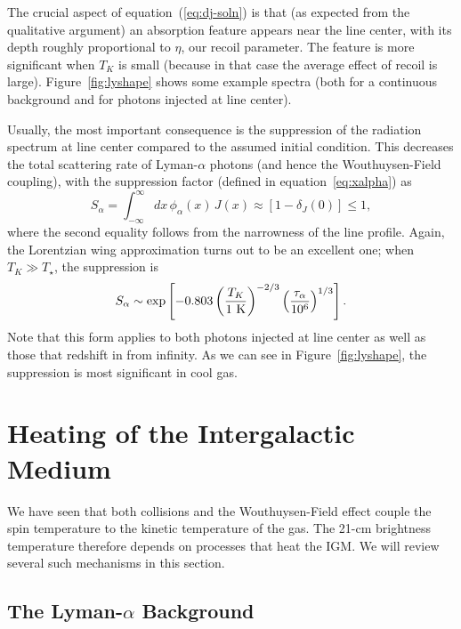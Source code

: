 The crucial aspect of equation~(\ref{eq:dj-soln}) is that (as expected from the qualitative argument) an absorption feature appears near the line center, with its depth roughly proportional to $\eta$, our recoil parameter.  The feature is more significant when $T_K$ is small (because in that case the average effect of recoil is large). Figure~\ref{fig:lyshape} shows some example spectra (both for a continuous background and for photons injected at line center).

Usually, the most important consequence is the suppression of the radiation spectrum at line center compared to the assumed initial condition.  This decreases the total scattering rate of Lyman-$\alpha$ photons (and hence the Wouthuysen-Field coupling), with the suppression factor (defined in equation~\ref{eq:xalpha}) as \cite{chen04} 
\begin{equation}
S_\alpha = \int_{-\infty}^\infty d x \, \phi_\alpha(x)\, J(x) \approx
[1 - \delta_J(0)] \le 1,
\label{eq:salpha-defn}
\end{equation}
where the second equality follows from the narrowness of the line profile.  Again, the Lorentzian wing approximation turns out to be an excellent one; when $T_K \gg T_\star$, the suppression is \cite{furl06-lyheat}
\begin{equation} S_\alpha \sim \exp \left[ -0.803 \left({T_K\over
1~{\rm K}}\right)^{-2/3} \left( \frac{\tau_\alpha}{10^{6}}
\right)^{1/3} \right].
\label{eq:salpha-approx}
\end{equation}
Note that this form applies to both photons injected at line center as well as those that redshift in from infinity.  As we can see in Figure~\ref{fig:lyshape}, the suppression is most significant in cool gas.


\section{Heating of the Intergalactic Medium} 

We have seen that both collisions and the Wouthuysen-Field effect couple the spin temperature to the kinetic temperature of the gas. The 21-cm brightness temperature therefore depends on processes that heat the IGM. We will review several such mechanisms in this section.

\subsection{The Lyman-$\alpha$ Background}

